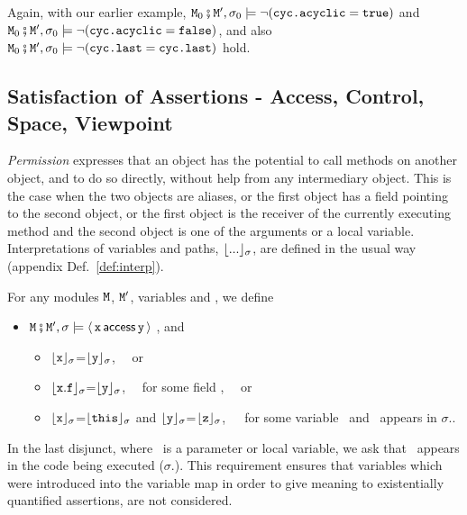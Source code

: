 \noindent
Again, with our earlier example,  
${\mbox{\tt{\ensuremath{{\mbox{\tt{M}}}}}}}_0\fatsemi {\mbox{\tt{\ensuremath{{\mbox{\tt{M}}}}}}}', \sigma_0 \models \neg ({\mbox{\tt{cyc.acyclic}}}={\mbox{\tt{true}}})$    and  
${\mbox{\tt{\ensuremath{{\mbox{\tt{M}}}}}}}_0\fatsemi {\mbox{\tt{\ensuremath{{\mbox{\tt{M}}}}}}}', \sigma_0 \models  \neg ({\mbox{\tt{cyc.acyclic}}}={\mbox{\tt{false}}})$, 
and also 
${\mbox{\tt{\ensuremath{{\mbox{\tt{M}}}}}}}_0\fatsemi {\mbox{\tt{\ensuremath{{\mbox{\tt{M}}}}}}}', \sigma_0 \models  \neg ({\mbox{\tt{cyc.last}}}={\mbox{\tt{cyc.last}}})$
hold.


\subsection{Satisfaction of Assertions - Access, Control, Space, Viewpoint}
\label{sect:pcsv} 

\textit{Permission} expresses that an object has the potential to call
methods on another object, and to do so directly, without  help from any
intermediary object. This is the case when the two objects are aliases, 
or the first object has a field pointing to the second object, or
the first object is the receiver of the currently executing method and the second object is one of the 
arguments or a local variable. Interpretations of variables and paths, ${\lfloor{ {...}}\rfloor_{\sigma}}$, are defined
in the usual way (appendix Def.~\ref{def:interp}).


\begin{definition}[%
Permission]  \label{def:valid:assertion:access}
For any modules ${\mbox{\tt{\ensuremath{{\mbox{\tt{M}}}}}}}$, ${\mbox{\tt{\ensuremath{{\mbox{\tt{M}}}}}}}'$,  variables  and , we define
\begin{itemize}
\item
${\mbox{\tt{\ensuremath{{\mbox{\tt{M}}}}}}}\fatsemi {\mbox{\tt{\ensuremath{{\mbox{\tt{M}}}}}}}', \sigma \models  \langle\, {\mbox{\tt{x}}}\, \mathsf{access}\, {\mbox{\tt{y}}}\, \rangle$   \IFF  {}, and \begin{itemize}
\item
${\lfloor{ {{\mbox{\tt{x}}}}}\rfloor_{\sigma}}$=${\lfloor{ {{\mbox{\tt{y}}}}}\rfloor_{\sigma}}$, \ \ or
\item
${\lfloor{ {{\mbox{\tt{x}}}.{\mbox{\tt{f}}}}}\rfloor_{\sigma}}$=${\lfloor{ {{\mbox{\tt{y}}}}}\rfloor_{\sigma}}$, \  \ for some field ,  \ \ or
\item
${\lfloor{ {{\mbox{\tt{x}}}}}\rfloor_{\sigma}}$=${\lfloor{ {{\mbox{\tt{this}}}}}\rfloor_{\sigma}}$ and
  ${\lfloor{ {{\mbox{\tt{y}}}}}\rfloor_{\sigma}}$=${\lfloor{ {{{\mbox{\tt{z}}}}}}\rfloor_{\sigma}}$,\ \ \ 
for some variable \z\ and  \z\ appears in  $\sigma$..
 \end{itemize}
\end{itemize}
\end{definition}

\noindent 
In the last disjunct, where \z\ is a parameter or local variable,
we  ask that   \z\ appears in the code being executed ($\sigma$.).
This requirement %
ensures that variables which were introduced into the variable map 
in order to give meaning to existentially quantified assertions, are not considered.


